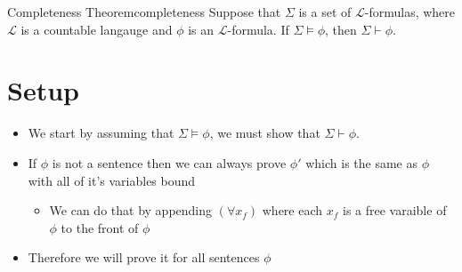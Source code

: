 \begin{theorem}{Completeness Theorem}{completeness}
Suppose that $\Sigma$ is a set of $\mathcal{L}$-formulas, where $ \mathcal{L}$ is a countable langauge  and $\phi$ is an $\mathcal{L}$-formula. If $\Sigma \models \phi$, then $\Sigma \vdash \phi$.

\section*{Setup}

\begin{itemize}
    \item We start by assuming that $ \Sigma \models \phi$, we must show that $ \Sigma \vdash \phi$.
    \item If $ \phi$ is not a sentence then we can always prove $ \phi'$ which is the same as $ \phi$ with all of it's variables bound
    \begin{itemize}
        \item We can do that by appending $ \left( \forall  x _{f}  \right)$ where each $ x_{f}$  is a free varaible of $ \phi$ to the front of $ \phi$ 
    \end{itemize}
\item Therefore we will prove it for all sentences $ \phi$ 
\end{itemize}

\end{theorem}
